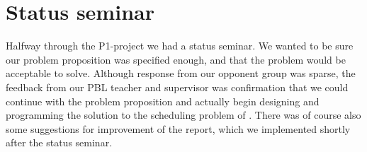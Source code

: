 \section{Status seminar}
Halfway through the P1-project we had a status seminar. We wanted to be sure our problem proposition was specified enough, and that the problem would be acceptable to solve. Although response from our opponent group was sparse, the feedback from our PBL teacher and supervisor was confirmation that we could continue with the problem proposition and actually begin designing and programming the solution to the scheduling problem of \siemens. There was of course also some suggestions for improvement of the report, which we implemented shortly after the status seminar.